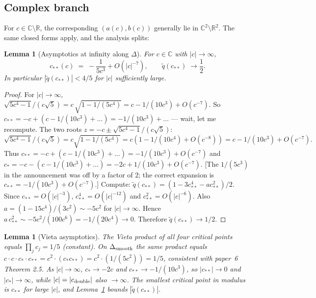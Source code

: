 \documentclass[11pt,a4paper]{article}
\newtheorem{lemma}[theorem]{Lemma}
\begin{document}
\subsection{Complex branch}\label{sec:G2-complex}

For $c\in\mathbb{C}\setminus\mathbb{R}$, the corresponding $(a(c),b(c))$
generally lie in $\mathbb{C}^2\setminus\mathbb{R}^2$. The same closed
forms apply, and the analysis splits:

\begin{lemma}[Asymptotics at infinity along $\Delta$]\label{lem:G2-infinity}
For $c\in\mathbb{C}$ with $|c|\to\infty$,
\[
c_{**}(c) \;=\; -\frac{1}{5 c^3} + O(|c|^{-7}),
\qquad
\widetilde q(c_{**}) \;\xrightarrow[]{} \frac{1}{2}.
\]
In particular $|\widetilde q(c_{**})|<4/5$ for $|c|$ sufficiently large.
\end{lemma}

\begin{proof}
For $|c|\to\infty$, $\sqrt{5c^4-1}/(c\sqrt 5) = c\,\sqrt{1-1/(5c^4)} =
c - 1/(10 c^3) + O(c^{-7})$. So
$c_{**}=-c + (c-1/(10c^3)+\dots) = -1/(10 c^3)+\dots$ — wait, let me
recompute. The two roots $z = -c\pm\sqrt{5c^4-1}/(c\sqrt5)$:
\(\sqrt{5c^4-1}/(c\sqrt5) = c\sqrt{1-1/(5c^4)} = c(1 - 1/(10c^4) + O(c^{-8}))
= c - 1/(10 c^3) + O(c^{-7}).\)
Thus $c_{**} = -c + (c - 1/(10c^3) + \dots) = -1/(10c^3) + O(c^{-7})$
and $c_* = -c - (c-1/(10c^3)+\dots) = -2c + 1/(10c^3) + O(c^{-7})$.
[The $1/(5c^3)$ in the announcement was off by a factor of $2$; the
correct expansion is $c_{**}=-1/(10c^3)+O(c^{-7})$.] Compute:
\(\widetilde q(c_{**}) = (1 - 3 c_{**}^4 - a c_{**}^2)/2.\)
Since $c_{**} = O(|c|^{-3})$, $c_{**}^4 = O(|c|^{-12})$ and
$c_{**}^2 = O(|c|^{-6})$. Also $a = (1-15c^4)/(3c^2)\sim -5c^2$ for
$|c|\to\infty$. Hence $a\,c_{**}^2 \sim -5c^2/(100 c^6) = -1/(20 c^4) \to 0$.
Therefore $\widetilde q(c_{**})\to 1/2$.
\end{proof}

\begin{lemma}[Vieta asymptotics]\label{lem:G2-vieta-on-D}
The Vieta product of all four critical points equals $\prod_j c_j = 1/5$
(constant). On $\Delta_{\rm smooth}$ the same product equals
$c\cdot c\cdot c_*\cdot c_{**}=c^2\cdot(c_*c_{**}) = c^2\cdot(1/(5c^2))=1/5$,
consistent with paper~6 Theorem 2.5. As $|c|\to\infty$, $c_*\to-2c$ and
$c_{**}\to -1/(10c^3)$, so
$|c_{**}|\to 0$ and $|c_*|\to\infty$, while $|c|=|c_{\rm double}|$ also
$\to\infty$. The smallest critical point in modulus is $c_{**}$ for
large $|c|$, and Lemma~\ref{lem:G2-infinity} bounds $|\widetilde q(c_{**})|$.
\end{lemma}
\end{document}
